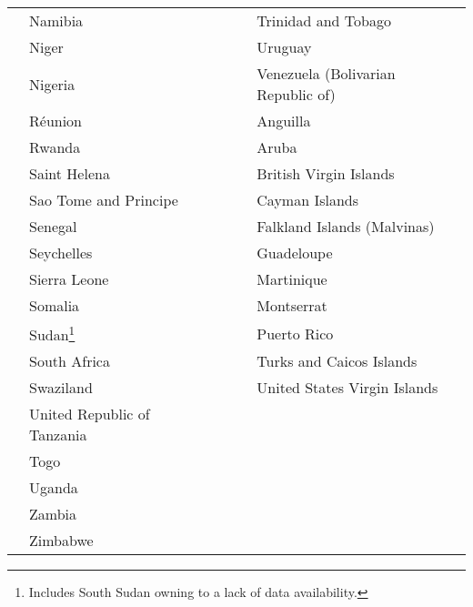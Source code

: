 \begin{longtable}{p{1.6cm}p{2cm}p{1.3cm}p{2.8cm}p{1.5cm}p{2.2cm}p{3cm}p{2cm}}
   & Namibia &  &  &  &  & Trinidad and Tobago &  \\ 
   & Niger &  &  &  &  & Uruguay &  \\ 
   & Nigeria &  &  &  &  & Venezuela (Bolivarian Republic of) &  \\ 
   & Réunion &  &  &  &  & Anguilla &  \\ 
   & Rwanda &  &  &  &  & Aruba &  \\ 
   & Saint Helena &  &  &  &  & British Virgin Islands &  \\ 
   & Sao Tome and Principe &  &  &  &  & Cayman Islands &  \\ 
   & Senegal &  &  &  &  & Falkland Islands (Malvinas) &  \\ 
   & Seychelles &  &  &  &  & Guadeloupe &  \\ 
   & Sierra Leone &  &  &  &  & Martinique &  \\ 
   & Somalia &  &  &  &  & Montserrat &  \\ 
   & Sudan\footnote{Includes South Sudan owning to a lack of data availability.} &  &  &  &  & Puerto Rico &  \\ 
   & South Africa &  &  &  &  & Turks and Caicos Islands &  \\ 
   & Swaziland &  &  &  &  & United States Virgin Islands &  \\ 
   & United Republic of Tanzania &  &  &  &  &  &  \\ 
   & Togo &  &  &  &  &  &  \\ 
   & Uganda &  &  &  &  &  &  \\ 
   & Zambia &  &  &  &  &  &  \\ 
   & Zimbabwe &  &  &  &  &  &  \\ 
   \bottomrule
\hline
\end{longtable}
